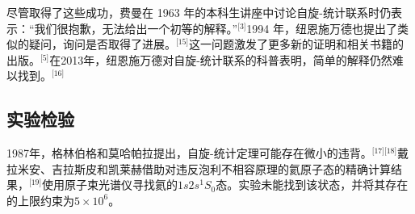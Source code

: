 尽管取得了这些成功，费曼在 1963 年的本科生讲座中讨论自旋-统计联系时仍表示：“我们很抱歉，无法给出一个初等的解释。”\(^\text{[3]}\)1994 年，纽恩施万德也提出了类似的疑问，询问是否取得了进展。\(^\text{[15]}\)这一问题激发了更多新的证明和相关书籍的出版。\(^\text{[5]}\)在2013年，纽恩施万德对自旋-统计联系的科普表明，简单的解释仍然难以找到。\(^\text{[16]}\)
\subsection{实验检验}
1987年，格林伯格和莫哈帕拉提出，自旋-统计定理可能存在微小的违背。\(^\text{[17][18]}\)戴拉米安、吉拉斯皮和凯莱赫借助对违反泡利不相容原理的氦原子态的精确计算结果，\(^\text{[19]}\)使用原子束光谱仪寻找氦的\(1s2s^1S_0\)态。实验未能找到该状态，并将其存在的上限约束为\(5\times10^{6}\)。